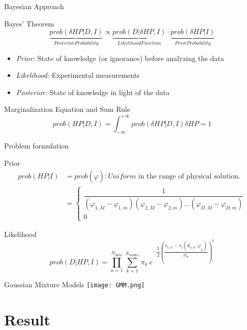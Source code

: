 \documentclass{beamer}
\begin{document}
	\begin{frame}{Bayesian Approach}
		\begin{block}{Bayes' Theorem}
			\begin{equation*}
				\underbrace{prob(\delta HP|D,I)}_{Posterior Probability} \propto
				\underbrace{prob(D|\delta HP,I)}_{Likelihood Function} \cdot \underbrace{prob(\delta HP|I)}_{Prior Probability}
			\end{equation*}
			\begin{itemize}
				\item \textit{Prior:} State of knowledge (or ignorance) before analyzing the data 
				
				\item \textit{Likelihood:} Experimental measurements
				\item \textit{Posterior:} State of knowledge in light of the data
			\end{itemize}
		\end{block}
	
	
		\begin{block}{Marginalization Equation and Sum Rule}
			\begin{equation*}
				prob(HP|D,I) = \int_{-\infty}^{+\infty} prob(\delta HP|D,I) \delta HP = 1
			\end{equation*}
		\end{block}
	\end{frame}
	
	\begin{frame}{Problem formulation}
		\begin{block}{Prior}
			\begin{equation*}
				\begin{split}			
				prob(HP|I) & = prob(\underline{\varphi}) : \textit{Uniform} \text{ in the range of physical solution.}\\
				& = \left\{ 
				\begin{array}{cc}
				\dfrac{1}{(\varphi_{1, M} - \varphi_{1, m}) (\varphi_{2, M} - \varphi_{2, m}) \dots (\varphi_{D, M} - \varphi_{D, m})} \\
				0 
				\end{array} \right.
				\end{split}
			\end{equation*}				
		\end{block}
		
		\begin{block}{Likelihood}
			\begin{equation*}
				prob(D|HP,I) = \prod_{n = 1}^{N_{data}} \sum_{k = 1}^{N_{modes}} \pi_k \ e^{-\dfrac{1}{2} \left(\dfrac{v_{t,n} - v_t(d_{v,n}, \underline{\varphi}_k)}{\sigma_n} \right)^2}
			\end{equation*}
		\end{block}	
	\end{frame}

	\begin{frame}{Gaussian Mixture Models}
		\centering
		\texttt{[image: GMM.png]}
	\end{frame}

\section{Result}
\end{document}
